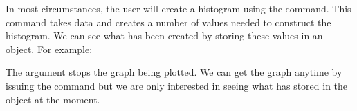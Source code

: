 In most circumstances, the user will create a histogram using the  command. This command takes data and creates a number of values needed to construct the histogram. We can see what has been created by storing these values in an object. For example: 
\begin{Schunk}
\end{Schunk}
The  argument stops the graph being plotted. We can get the graph anytime by issuing the  command but we are only interested in seeing what \R{} has stored in the  object at the moment.  

